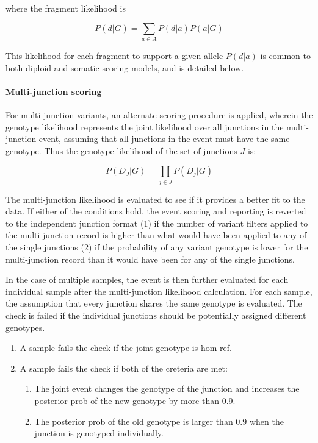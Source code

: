 \documentclass{article}
\begin{document}
\noindent
where the fragment likelihood is

\begin{equation*}
P(d \vert G) = \sum_{a \in A} P(d \vert a) P(a|G)
\end{equation*}

This likelihood for each fragment to support a given allele $P(d \vert a)$ is common to both diploid and somatic scoring models, and is detailed below.

\paragraph{Multi-junction scoring}

For multi-junction variants, an alternate scoring procedure is applied, wherein the genotype likelihood represents the joint likelihood over all junctions in the multi-junction event, assuming that all junctions in the event must have the same genotype. Thus the genotype likelihood of the set of junctions $J$ is:

\begin{equation*}
P(D_{J} \vert G) = \prod_{j \in J} P(D_{j} \vert G)
\end{equation*}

The multi-junction likelihood is evaluated to see if it provides a better fit to the data. If either of the conditions hold, the event scoring and reporting is reverted to the independent junction format (1) if the number of variant filters applied to the multi-junction record is higher than what would have been applied to any of the single junctions (2) if the probability of any variant genotype is lower for the multi-junction record than it would have been for any of the single junctions.

In the case of multiple samples, the event is then further evaluated for each individual sample after the multi-junction likelihood calculation. For each sample, the assumption that every junction shares the same genotype is evaluated. The check is failed if the individual junctions should be potentially assigned different genotypes.
\begin{enumerate}
    \item A sample fails the check if the joint genotype is hom-ref.
    \item A sample fails the check if both of the creteria are met:
    \begin{enumerate}
        \item The joint event changes the genotype of the junction and increases the posterior prob of the new genotype by more than 0.9.
        \item The posterior prob of the old genotype is larger than 0.9 when the junction is genotyped individually.
    \end{enumerate}
\end{enumerate}
\end{document}
